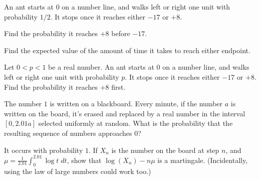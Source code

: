 \begin{problem}
	An ant starts at $0$ on a number line,
	and walks left or right one unit with probability $1/2$.
	It stops once it reaches either $-17$ or $+8$.
	\begin{enumerate}[(a)]
		\ii Find the probability it reaches $+8$ before $-17$.

		\ii Find the expected value of the amount of time
		it takes to reach either endpoint.
	\end{enumerate}
\end{problem}

\begin{problem}
	Let $0 < p < 1$ be a real number.
	An ant starts at $0$ on a number line,
	and walks left or right one unit with probability $p$.
	It stops once it reaches either $-17$ or $+8$.
	Find the probability it reaches $+8$ first.
\end{problem}

\begin{problem}
	The number $1$ is written on a blackboard.
	Every minute, if the number $a$ is written on the board,
	it's erased and replaced by a real number
	in the interval $[0, 2.01a]$ selected uniformly at random.
	What is the probability that the resulting sequence of numbers approaches $0$?
	\begin{hint}
		It occurs with probability $1$.
		If $X_n$ is the number on the board at step $n$,
		and $\mu = \frac{1}{2.01} \int_0^{2.01} \log t \; dt$,
		show that $\log(X_n) - n \mu$ is a martingale.
		(Incidentally, using the law of large numbers could work too.)
	\end{hint}
\end{problem}
